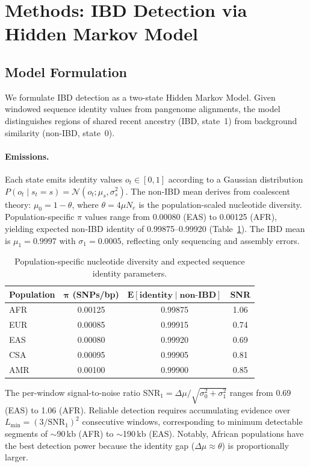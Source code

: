 \section{Methods: IBD Detection via Hidden Markov Model}
\label{sec:methods_ibd}

\subsection{Model Formulation}

We formulate IBD detection as a two-state Hidden Markov Model. Given windowed sequence identity values from pangenome alignments, the model distinguishes regions of shared recent ancestry (IBD, state~1) from background similarity (non-IBD, state~0).

\paragraph{Emissions.}
Each state emits identity values $o_t \in [0,1]$ according to a Gaussian distribution $P(o_t \mid s_t = s) = \mathcal{N}(o_t; \mu_s, \sigma_s^2)$. The non-IBD mean derives from coalescent theory: $\mu_0 = 1 - \theta$, where $\theta = 4\mu N_e$ is the population-scaled nucleotide diversity. Population-specific $\pi$ values range from 0.00080 (EAS) to 0.00125 (AFR), yielding expected non-IBD identity of 0.99875--0.99920 (Table~\ref{tab:pop_params}). The IBD mean is $\mu_1 = 0.9997$ with $\sigma_1 = 0.0005$, reflecting only sequencing and assembly errors.

\begin{table}[ht]
\centering
\caption{Population-specific nucleotide diversity and expected sequence identity parameters.}
\label{tab:pop_params}
\begin{tabular}{lccc}
\hline
\textbf{Population} & $\boldsymbol{\pi}$ \textbf{(SNPs/bp)} & $\boldsymbol{E[\text{identity} \mid \text{non-IBD}]}$ & \textbf{SNR} \\
\hline
AFR & 0.00125 & 0.99875 & 1.06 \\
EUR & 0.00085 & 0.99915 & 0.74 \\
EAS & 0.00080 & 0.99920 & 0.69 \\
CSA & 0.00095 & 0.99905 & 0.81 \\
AMR & 0.00100 & 0.99900 & 0.85 \\
\hline
\end{tabular}
\end{table}

The per-window signal-to-noise ratio SNR$_1 = \Delta\mu / \sqrt{\sigma_0^2 + \sigma_1^2}$ ranges from 0.69 (EAS) to 1.06 (AFR). Reliable detection requires accumulating evidence over $L_{\min} = (3/\text{SNR}_1)^2$ consecutive windows, corresponding to minimum detectable segments of $\sim$90\,kb (AFR) to $\sim$190\,kb (EAS). Notably, African populations have the best detection power because the identity gap ($\Delta\mu \approx \theta$) is proportionally larger.

